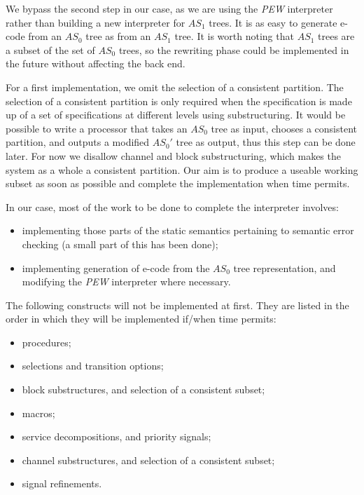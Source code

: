 We bypass the second step in our case, as we are using
the {\em PEW} interpreter rather than building a new interpreter for 
$AS_1$ trees. It is as easy to generate e-code from an $AS_0$ tree
as from an $AS_1$ tree. It is worth noting that $AS_1$ trees are
a subset of the set of $AS_0$ trees, so the rewriting phase could be
implemented in the future without affecting the back end.

For a first implementation, we omit the selection of a consistent 
partition. The selection of a consistent partition is only required
when the specification is made up of a set of specifications at
different levels using substructuring. It would be possible to write
a processor that takes an $AS_0$ tree as input, chooses a consistent
partition, and outputs a modified $AS_0'$ tree as output, thus this
step can be done later. For now we disallow channel and block
substructuring, which makes the system as a whole a consistent partition.
Our aim is to produce a useable working subset as soon as possible
and complete the implementation when time permits.

In our case, most of the work to be done to complete the interpreter
involves:

\begin{itemize}
\item implementing those parts of the static semantics pertaining to 
semantic error checking (a small part of this has been done);
\item implementing generation of e-code from the $AS_0$ tree
representation, and modifying the {\em PEW} interpreter where
necessary.
\end{itemize}

The following constructs will not be implemented at first. They are
listed in the order in which they will be implemented if/when time
permits:

\begin{itemize}
\item procedures;
\item selections and transition options;
\item block substructures, and selection of a consistent subset;
\item macros;
\item service decompositions, and priority signals;
\item channel substructures, and selection of a consistent subset;
\item signal refinements.
\end{itemize}

